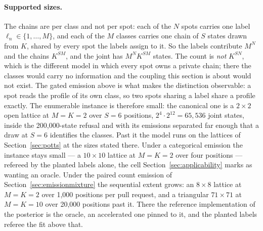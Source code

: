 \documentclass[11pt,a4paper]{article}
\begin{document}
\paragraph{Supported sizes.}
\label{par:coupled:sizes}
The chains are per class and not per spot: each of the $N$ spots carries one
label $\ell_n \in \{1, \dots, M\}$, and each of the $M$ classes carries one
chain of $S$ states drawn from $K$, shared by every spot the labels assign to
it. So the labels contribute $M^{N}$ and the chains $K^{SM}$, and the joint
has $M^{N} K^{SM}$ states. The count is \emph{not} $K^{SN}$, which is the
different model in which every spot owns a private chain; there the classes
would carry no information and the coupling this section is about would not
exist. The gated emission above is what makes the
distinction observable: a spot reads the profile of its own class, so two
spots sharing a label share a profile exactly.
The enumerable instance is therefore small: the
canonical one is a $2 \times 2$ open lattice at $M = K = 2$ over $S = 6$
positions, $2^4 \cdot 2^{12} = 65{,}536$ joint states, inside the 200,000-state
refusal and with its emissions separated far enough that a draw at $S = 6$
identifies the classes. Past it the model runs on the lattices of
Section~\ref{sec:potts} at the sizes stated there. Under a categorical emission
the instance stays small --- a $10 \times 10$ lattice at $M = K = 2$ over four
positions --- refereed by the planted labels alone, the cell
Section~\ref{sec:applicability} marks as wanting an oracle. Under the paired
count emission of Section~\ref{sec:emissionmixture} the sequential extent
grows: an $8 \times 8$ lattice at $M = K = 2$ over 1,000 positions per pull
request, and a triangular $71 \times 71$ at $M = K = 10$ over 20,000 positions
past it. There the reference implementation of the posterior is the oracle, an
accelerated one pinned to it, and the planted labels referee the fit above
that.
\end{document}
